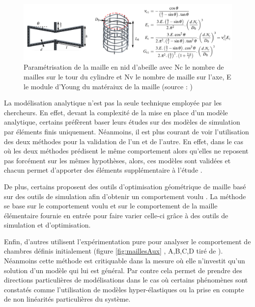 \documentclass[10pt, a4paper]{article}
\begin{document}
\begin{figure}[ht!]
\centering
\centerline{\includegraphics[scale=0.45]{ImageIntro/paramMailleNid.png}}
\caption{ Paramétrisation de la maille en nid d'abeille avec Nc le nombre de mailles sur le tour du cylindre et Nv le nombre de maille sur l'axe, E le module d'Young du matéraiux de la maille (source : \cite{Pfeil2018})}
\label{fig:paramMailleNid}
\end{figure}

        La modélisation analytique n'est pas la seule technique employée par les chercheurs. En effet, devant la complexité de la mise en place d'un modèle analytique, certains préfèrent baser leurs études sur des modèles de simulation par éléments finis \cite{AlvarezElipe2012} uniquement. Néanmoins, il est plus courant de voir l'utilisation des deux méthodes pour la validation de l'un et de l'autre. En effet, dans le cas où les deux méthodes prédisent le même comportement alors qu'elles ne reposent pas forcément sur les mêmes hypothèses, alors, ces modèles sont validées et chacun permet d'apporter des éléments supplémentaire à l'étude \cite{Karnessis2013}.
        
        De plus, certains proposent des outils d'optimisation géométrique de maille basé sur des outils de simulation afin d'obtenir un comportement voulu \cite{Schumacher2018}. La méthode se base sur le comportement voulu et sur le comportement de la maille élémentaire fournie en entrée pour faire varier celle-ci grâce à des outils de simulation et d'optimisation. 
        
        Enfin, d'autres utilisent l'expérimentation pure pour analyser le comportement de chambres définis initialement \cite{Simons2019} \cite{Takashima2010} (figure \ref{fig:maillesAux} , A,B,C,D tiré de \cite{Simons2019}). Néanmoins cette méthode est critiquable dans la mesure où elle n'investit qu'un solution d'un modèle qui lui est général. Par contre cela permet de prendre des directions particulières de modélisations dans le cas où certains phénomènes sont constatés comme l'utilisation de modèles hyper-élastiques ou la prise en compte de non linéarités particulières du système.
\end{document}

